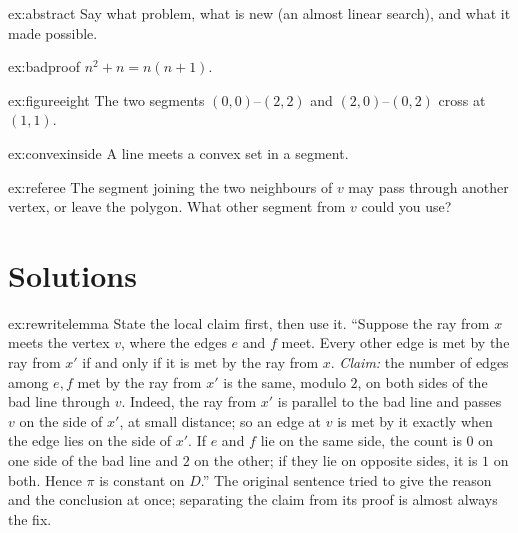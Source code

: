 \begin{hint}{ex:abstract}
Say what problem, what is new (an almost linear search), and what it made possible.
\end{hint}

\begin{hint}{ex:badproof}
$n^2+n=n(n+1)$.
\end{hint}

\begin{hint}{ex:figureeight}
The two segments $(0,0)$--$(2,2)$ and $(2,0)$--$(0,2)$ cross at $(1,1)$.
\end{hint}

\begin{hint}{ex:convexinside}
A line meets a convex set in a segment.
\end{hint}

\begin{hint}{ex:referee}
The segment joining the two neighbours of $v$ may pass through another vertex, or leave the polygon. What other segment from $v$ could you use?
\end{hint}

\section{Solutions}

\begin{solution}{ex:rewritelemma}
\idea State the local claim first, then use it.
\writeup ``Suppose the ray from $x$ meets the vertex $v$, where the edges $e$ and $f$ meet. Every other edge is met by the ray from $x'$ if and only if it is met by the ray from $x$. \emph{Claim:} the number of edges among $e,f$ met by the ray from $x'$ is the same, modulo $2$, on both sides of the bad line through $v$. Indeed, the ray from $x'$ is parallel to the bad line and passes $v$ on the side of $x'$, at small distance; so an edge at $v$ is met by it exactly when the edge lies on the side of $x'$. If $e$ and $f$ lie on the same side, the count is $0$ on one side of the bad line and $2$ on the other; if they lie on opposite sides, it is $1$ on both. Hence $\pi$ is constant on $D$.'' The original sentence tried to give the reason and the conclusion at once; separating the claim from its proof is almost always the fix.
\end{solution}

